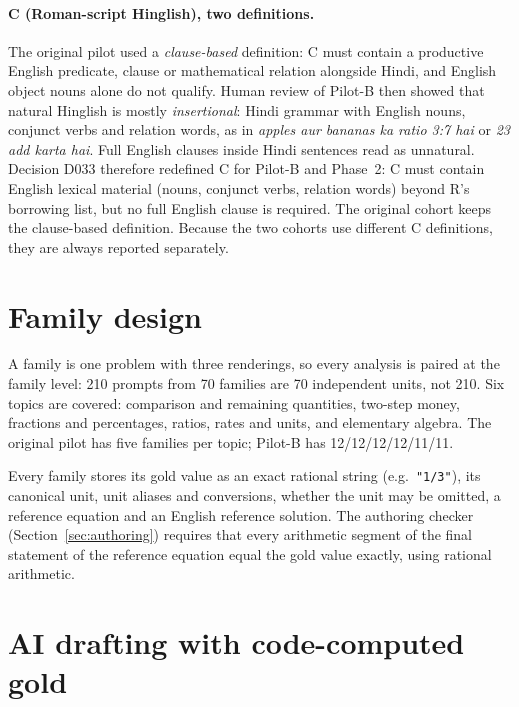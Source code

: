 \documentclass[12pt,a4paper,oneside]{report}
\renewcommand{\_}{\oldunderscore\allowbreak}
\begin{document}
\paragraph{C (Roman-script Hinglish), two definitions.} The original pilot used a \emph{clause-based} definition: C must contain a productive English predicate, clause or mathematical relation alongside Hindi, and English object nouns alone do not qualify. Human review of Pilot-B then showed that natural Hinglish is mostly \emph{insertional}: Hindi grammar with English nouns, conjunct verbs and relation words, as in \emph{apples aur bananas ka ratio 3:7 hai} or \emph{23 add karta hai}. Full English clauses inside Hindi sentences read as unnatural. Decision D033 therefore redefined C for Pilot-B and Phase~2: C must contain English lexical material (nouns, conjunct verbs, relation words) beyond R's borrowing list, but no full English clause is required. The original cohort keeps the clause-based definition. Because the two cohorts use different C definitions, they are always reported separately.

\section{Family design}

A family is one problem with three renderings, so every analysis is paired at the family level: 210 prompts from 70 families are 70 independent units, not 210. Six topics are covered: comparison and remaining quantities, two-step money, fractions and percentages, ratios, rates and units, and elementary algebra. The original pilot has five families per topic; Pilot-B has 12/12/12/12/11/11.

Every family stores its gold value as an exact rational string (e.g.\ \texttt{"1/3"}), its canonical unit, unit aliases and conversions, whether the unit may be omitted, a reference equation and an English reference solution. The authoring checker (Section~\ref{sec:authoring}) requires that every arithmetic segment of the final statement of the reference equation equal the gold value exactly, using rational arithmetic.

\section{AI drafting with code-computed gold}
\end{document}
